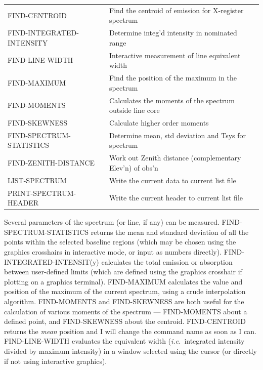 \documentclass[11pt,twoside]{report}
\newcommand{\ie}{{\it i.e.\,}}
\begin{document}
\begin{tabular}{ll}
FIND-CENTROID          & Find the centroid of emission for X-register spectrum\\
FIND-INTEGRATED-INTENSITY  & Determine integ'd intensity in nominated range\\
FIND-LINE-WIDTH        & Interactive measurement of line equivalent width \\
FIND-MAXIMUM           & Find the position of the maximum in the spectrum\\
FIND-MOMENTS           & Calculates the moments of the spectrum outside line core\\
FIND-SKEWNESS          & Calculate higher order moments\\
FIND-SPECTRUM-STATISTICS   & Determine mean, std deviation and Tsys for spectrum\\
FIND-ZENITH-DISTANCE   & Work out Zenith distance (complementary Elev'n) of obs'n\\
LIST-SPECTRUM          & Write the current data to current list file\\
PRINT-SPECTRUM-HEADER  & Write the current header to current list file\\
\end{tabular}

Several parameters of the spectrum (or line, if any) can be measured.
FIND-SPECTRUM-STATISTICS returns the mean and standard deviation of all the
points within the selected baseline regions (which may be chosen using the
graphics crosshairs in interactive mode, or input as numbers directly).
FIND-INTEGRATED-INTENSIT(y) calculates the total emission or absorption between
user-defined limits (which are defined using the graphics
crosshair if plotting on a graphics terminal).
FIND-MAXIMUM calculates the value and position of the maximum of the current
spectrum, using a crude interpolation algorithm. FIND-MOMENTS and FIND-SKEWNESS
are both useful for the calculation of various moments of the spectrum ---
FIND-MOMENTS about a defined point, and FIND-SKEWNESS about the centroid.
FIND-CENTROID returns the {\em mean} position and I will change the command
name as soon as I can. FIND-LINE-WIDTH evaluates the equivalent width (\ie
integrated intensity divided by maximum intensity) in a window selected using
the cursor (or directly if not using interactive graphics).
\end{document}
